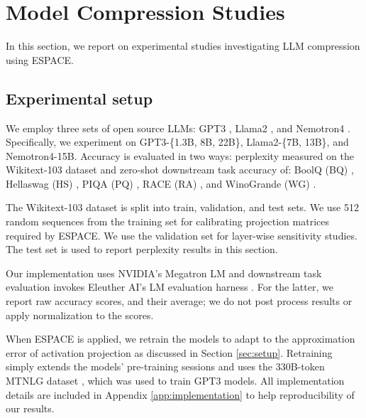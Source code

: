 \documentclass{article}
\theoremstyle{plain}
\begin{document}
\section{Model Compression Studies}
\label{sec:experiments}
In this section, we report on experimental studies investigating LLM compression using ESPACE.
\subsection{Experimental setup}
We employ three sets of open source LLMs: GPT3 \cite{shoeybi2020megatronlm}, Llama2 \cite{touvron2023llama}, {and Nemotron4 \cite{nemotron}}. Specifically, we experiment on GPT3-\{1.3B, 8B, 22B\}, Llama2-\{7B, 13B\}, {and Nemotron4-15B}. Accuracy is evaluated in two ways: perplexity measured on the Wikitext-103 dataset \cite{merity2016pointer} and zero-shot downstream task accuracy of: BoolQ (BQ) \cite{clark2019boolq}, Hellaswag (HS) \cite{zellers2019hellaswag}, PIQA (PQ) \cite{Bisk2020piqa}, RACE (RA) \cite{lai-etal-2017-race}, and WinoGrande (WG) \cite{ai2:winogrande}.

The Wikitext-103 dataset is split into train, validation, and test sets. We use 512 random sequences from the training set for calibrating projection matrices required by ESPACE. We use the validation set for layer-wise sensitivity studies. The test set is used to report perplexity results in this section.

Our implementation uses NVIDIA's Megatron LM \cite{shoeybi2020megatronlm} and downstream task evaluation invokes Eleuther AI's LM evaluation harness \cite{eval-harness}. For the latter, we report raw accuracy scores, and their average; we do not post process results or apply normalization to the scores.

When ESPACE is applied, we retrain the models to adapt to the approximation error of activation projection as discussed in Section \ref{sec:setup}. Retraining simply extends the models' pre-training sessions and uses the 330B-token MTNLG dataset \cite{smith2022mtnlg}, which was used to train GPT3 models. All implementation details are included in Appendix \ref{app:implementation} to help reproducibility of our results. 
\end{document}
